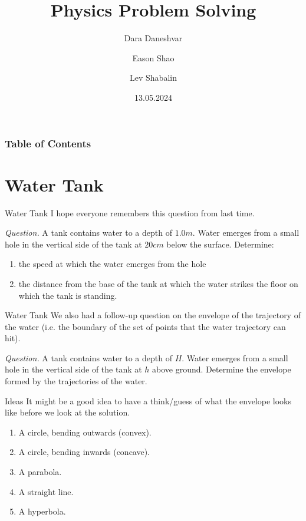 \documentclass{beamer}
\title[Physics Problem Solving]{Physics Problem Solving}
\author{Dara Daneshvar \and Eason Shao \and Lev Shabalin}
\institute[]{Physics Problem Solving Society\\St Paul's School}
\date{13.05.2024}
\begin{document}
    \frame{\titlepage}
    
    \begin{frame}
        \frametitle{Table of Contents}
        \tableofcontents
    \end{frame}
    
    \section{Water Tank}

    \begin{frame}{Water Tank}
        I hope everyone remembers this question from last time.\pause

        \textit{Question.} 
            A tank contains water to a depth of \(1.0 \si{m}\). Water emerges from a small hole in the vertical side of the tank at \(20 \si{cm}\) below the surface. Determine: 
            \begin{enumerate}
                \item the speed at which the water emerges from the hole 
                \item the distance from the base of the tank at which the water strikes the floor on which the tank is standing.
            \end{enumerate}
    \end{frame}

    \begin{frame}{Water Tank}
        We also had a follow-up question on the envelope of the trajectory of the water (i.e. the boundary of the set of points that the water trajectory can hit).\pause
        
        \textit{Question.} A tank contains water to a depth of \(H\). Water emerges from a small hole in the vertical side of the tank at \(h\) above ground. Determine the envelope formed by the trajectories of the water.

    \end{frame}

    \begin{frame}{Ideas}
        It might be a good idea to have a think/guess of what the envelope looks like before we look at the solution.\pause

        \begin{enumerate}
            \item A circle, bending outwards (convex).
            \item A circle, bending inwards (concave).
            \item A parabola.
            \item A straight line.
            \item A hyperbola.
        \end{enumerate}

        \pause\href{https://www.desmos.com/calculator/srwqthbwfu}{}
    \end{frame}
\end{document}
